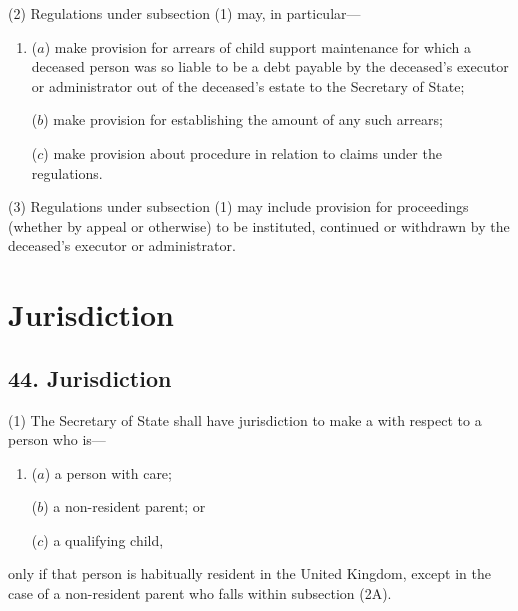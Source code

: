 \documentclass[12pt,a4paper]{article}
\begin{document}
(2) Regulations under subsection (1) may, in particular---
\begin{enumerate}\item[]
($a$) make provision for arrears of child support maintenance for which a deceased person was so liable to be a debt payable by the deceased’s executor or administrator out of the deceased’s estate to the Secretary of State;

($b$) make provision for establishing the amount of any such arrears;

($c$) make provision about procedure in relation to claims under the regulations.
\end{enumerate}

(3) Regulations under subsection (1) may include provision for proceedings (whether by appeal or otherwise) to be instituted, continued or withdrawn by the deceased’s executor or administrator.


\section{Jurisdiction}

\subsection{44. Jurisdiction}

(1) The Secretary of State shall have jurisdiction to make a  with respect to a person who is---
\begin{enumerate}\item[]
($a$) a person with care;

($b$) a non-resident parent; or

($c$) a qualifying child,
\end{enumerate}
only if that person is habitually resident in the United Kingdom, except in the case of a non-resident parent who falls within subsection (2A).
\end{document}
